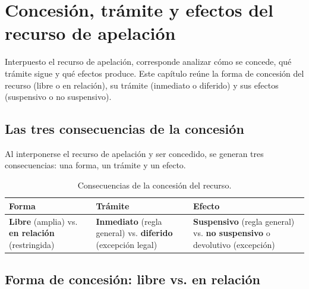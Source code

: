 \documentclass[12pt,oneside]{book}
\begin{document}
\chapter[Concesión, trámite y efectos de la apelación]{Concesión, trámite y efectos del recurso de apelación}\label{cap:concesion}

Interpuesto el recurso de apelación, corresponde analizar cómo se concede, qué trámite sigue y qué efectos produce. Este capítulo reúne la forma de concesión del recurso (libre o en relación), su trámite (inmediato o diferido) y sus efectos (suspensivo o no suspensivo).

\section{Las tres consecuencias de la concesi\'on}

Al interponerse el recurso de apelaci\'on y ser concedido, se generan tres consecuencias: una forma, un tr\'amite y un efecto.

\begin{table}[H]
\centering
\begin{tabularx}{\textwidth}{
    >{\raggedright\arraybackslash}X
    >{\raggedright\arraybackslash}X
    >{\raggedright\arraybackslash}X
}
\toprule
\textbf{Forma} & \textbf{Tr\'amite} & \textbf{Efecto} \\
\midrule
\textbf{Libre} (amplia) vs. \textbf{en relaci\'on} (restringida) &
\textbf{Inmediato} (regla general) vs. \textbf{diferido} (excepci\'on legal) &
\textbf{Suspensivo} (regla general) vs. \textbf{no suspensivo} o devolutivo (excepci\'on) \\
\bottomrule
\end{tabularx}
\caption{Consecuencias de la concesi\'on del recurso.}
\end{table}

\section{Forma de concesi\'on: libre vs. en relaci\'on}
\end{document}
